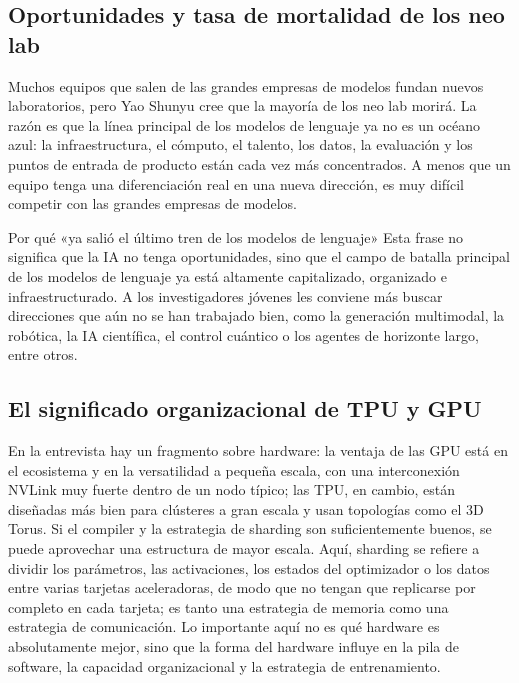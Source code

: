 \documentclass[a4paper]{article}
\begin{document}
\subsection{Oportunidades y tasa de mortalidad de los neo lab}

Muchos equipos que salen de las grandes empresas de modelos fundan nuevos laboratorios, pero Yao Shunyu cree que la mayoría de los neo lab morirá. La razón es que la línea principal de los modelos de lenguaje ya no es un océano azul: la infraestructura, el cómputo, el talento, los datos, la evaluación y los puntos de entrada de producto están cada vez más concentrados. A menos que un equipo tenga una diferenciación real en una nueva dirección, es muy difícil competir con las grandes empresas de modelos.

\begin{knowledgebox}{Por qué «ya salió el último tren de los modelos de lenguaje»}
Esta frase no significa que la IA no tenga oportunidades, sino que el campo de batalla principal de los modelos de lenguaje ya está altamente capitalizado, organizado e infraestructurado. A los investigadores jóvenes les conviene más buscar direcciones que aún no se han trabajado bien, como la generación multimodal, la robótica, la IA científica, el control cuántico o los agentes de horizonte largo, entre otros.
\end{knowledgebox}

\subsection{El significado organizacional de TPU y GPU}

En la entrevista hay un fragmento sobre hardware: la ventaja de las GPU está en el ecosistema y en la versatilidad a pequeña escala, con una interconexión NVLink muy fuerte dentro de un nodo típico; las TPU, en cambio, están diseñadas más bien para clústeres a gran escala y usan topologías como el 3D Torus. Si el compiler y la estrategia de sharding son suficientemente buenos, se puede aprovechar una estructura de mayor escala. Aquí, sharding se refiere a dividir los parámetros, las activaciones, los estados del optimizador o los datos entre varias tarjetas aceleradoras, de modo que no tengan que replicarse por completo en cada tarjeta; es tanto una estrategia de memoria como una estrategia de comunicación. Lo importante aquí no es qué hardware es absolutamente mejor, sino que la forma del hardware influye en la pila de software, la capacidad organizacional y la estrategia de entrenamiento.
\end{document}

